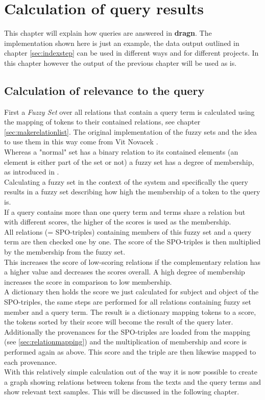 \section{Calculation of query results}
\label{sec:querystep}
This chapter will explain how queries are answered in \textbf{dragn}. The implementation shown here is just an example, the data output outlined in chapter \ref{sec:indexstep} can be used in different ways and for different projects. In this chapter however the output of the previous chapter will be used as is. \\

\subsection{Calculation of relevance to the query}
\label{sec:popdict}
First a \textit{Fuzzy Set} over all relations that contain a query term is calculated using the mapping of tokens to their contained relations, see chapter \ref{sec:makerelationlist}. The original implementation of the fuzzy sets and the idea to use them in this way come from Vit Novacek \cite{novavcek2014skimmr}.\\
Whereas a "normal" set has a binary relation to its contained elements (an element is either part of the set or not) a fuzzy set has a degree of membership, as introduced in \cite{zadeh1965fuzzy}.\\
Calculating a fuzzy set in the context of the system and specifically the query results in a fuzzy set describing how high the membership of a token to the query is.\\
If a query contains more than one query term and terms share a relation but with different scores, the higher of the scores is used as the membership.\\
All relations (= SPO-triples) containing members of this fuzzy set and a query term are then checked one by one. The score of the SPO-triples is then multiplied by the membership from the fuzzy set.\\
This increases the score of low-scoring relations if the complementary relation has a higher value and decreases the scores overall. A high degree of membership increases the score in comparison to low membership.\\
A dictionary then holds the score we just calculated for subject and object of the SPO-triples, the same steps are performed for all relations containing fuzzy set member and a query term. The result is a dictionary mapping tokens to a score, the tokens sorted by their score will become the result of the query later.\\
Additionally the provenances for the SPO-triples are loaded from the mapping (see \ref{sec:relationmapping}) and the multiplication of membership and score is performed again as above. This score and the triple are then likewise mapped to each provenance.\\
With this relatively simple calculation out of the way it is now possible to create a graph showing relations between tokens from the texts and the query terms and show relevant text samples. This will be discussed in the following chapter.

